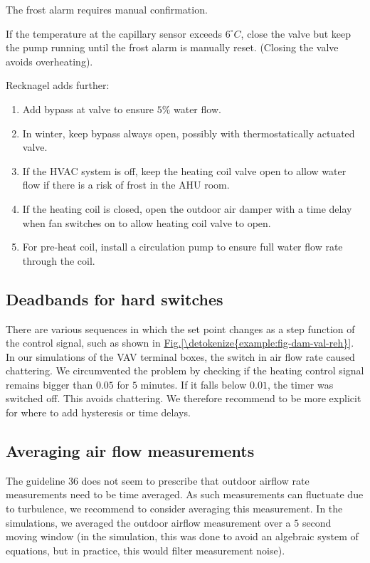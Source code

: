 \documentclass[letterpaper,10pt, openany,english]{sphinxmanual}
\begin{document}
The frost alarm requires manual confirmation.

If the temperature at the capillary sensor exceeds \(6^\circ C\),
close the valve but keep the pump running until the frost alarm is manually reset.
(Closing the valve avoids overheating).

Recknagel  adds further:
\begin{enumerate}
\def\theenumi{\arabic{enumi}}
\def\labelenumi{\theenumi .}
\makeatletter\def\p@enumii{\p@enumi \theenumi .}\makeatother
\item {} 
Add bypass at valve to ensure \(5\%\) water flow.

\item {} 
In winter, keep bypass always open, possibly with thermostatically actuated valve.

\item {} 
If the HVAC system is off, keep the heating coil valve open to allow water flow
if there is a risk of frost in the AHU room.

\item {} 
If the heating coil is closed,
open the outdoor air damper with a time delay when fan switches on to allow heating coil valve to open.

\item {} 
For pre-heat coil, install a circulation pump to ensure full water flow rate through the coil.

\end{enumerate}


\subsection{Deadbands for hard switches}
\label{\detokenize{example:deadbands-for-hard-switches}}\label{\detokenize{example:sec-dea-har-swi}}
There are various sequences in which the set point changes as a step function of
the control signal, such as shown in \hyperref[\detokenize{example:fig-dam-val-reh}]{Fig.\@ \ref{\detokenize{example:fig-dam-val-reh}}}.
In our simulations of the VAV terminal boxes, the switch in air flow rate caused
chattering. We circumvented the problem by checking if the heating control signal
remains bigger than \(0.05\) for \(5\) minutes. If it falls below \(0.01\),
the timer was switched off. This avoids chattering.
We therefore recommend to be more explicit for
where to add hysteresis or time delays.


\subsection{Averaging air flow measurements}
\label{\detokenize{example:averaging-air-flow-measurements}}
The guideline 36 does not seem to prescribe that outdoor airflow rate
measurements need to be time averaged. As such measurements can
fluctuate due to turbulence, we recommend to consider averaging
this measurement. In the simulations, we averaged the outdoor airflow
measurement over a \(5\) second moving window (in the simulation,
this was done to avoid an algebraic system of equations,
but in practice, this would filter measurement noise).
\end{document}
